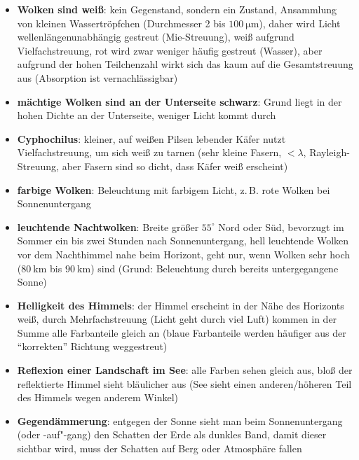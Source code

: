\linie
\begin{itemize}
    \item
    \textbf{Wolken sind weiß}:
    kein Gegenstand, sondern ein Zustand, Ansammlung von kleinen
    Wassertröpfchen (Durchmesser 2 bis $\SI{100}{\micro\meter}$), daher
    wird Licht wellenlängenunabhängig gestreut (Mie-Streuung),
    weiß aufgrund Vielfachstreuung, rot wird zwar weniger häufig gestreut
    (Wasser), aber aufgrund der hohen Teilchenzahl wirkt sich das kaum auf
    die Gesamtstreuung aus (Absorption ist vernachlässigbar)
    
    \item
    \textbf{mächtige Wolken sind an der Unterseite schwarz}:
    Grund liegt in der hohen Dichte an der Unterseite, weniger Licht kommt
    durch
    
    \item
    \textbf{Cyphochilus}:
    kleiner, auf weißen Pilsen lebender Käfer nutzt Vielfachstreuung, um sich
    weiß zu tarnen (sehr kleine Fasern, $< \lambda$, Rayleigh-Streuung, aber
    Fasern sind so dicht, dass Käfer weiß erscheint)
    
    \item
    \textbf{farbige Wolken}:
    Beleuchtung mit farbigem Licht, z.\,B. rote Wolken bei Sonnenuntergang
    
    \item
    \textbf{leuchtende Nachtwolken}:
    Breite größer $55^\circ$ Nord oder Süd, bevorzugt im Sommer
    ein bis zwei Stunden nach Sonnenuntergang,
    hell leuchtende Wolken vor dem Nachthimmel nahe beim Horizont,
    geht nur, wenn Wolken sehr hoch ($\SI{80}{\kilo\meter}$ bis $\SI{90}{\kilo\meter}$) sind
    (Grund: Beleuchtung durch bereits untergegangene Sonne)
    
    \item
    \textbf{Helligkeit des Himmels}:
    der Himmel erscheint in der Nähe des Horizonts weiß,
    durch Mehrfachstreuung (Licht geht durch viel Luft) kommen in der Summe
    alle Farbanteile gleich an (blaue Farbanteile werden häufiger aus der
    "`korrekten"' Richtung weggestreut)
    
    \item
    \textbf{Reflexion einer Landschaft im See}:
    alle Farben sehen gleich aus,
    bloß der reflektierte Himmel sieht bläulicher aus
    (See sieht einen anderen/höheren Teil des Himmels wegen anderem Winkel)
    
    \item
    \textbf{Gegendämmerung}:
    entgegen der Sonne sieht man beim Sonnenuntergang (oder -auf"-gang)
    den Schatten der Erde als dunkles Band,
    damit dieser sichtbar wird, muss der Schatten auf Berg oder Atmosphäre
    fallen
    

\end{itemize}
